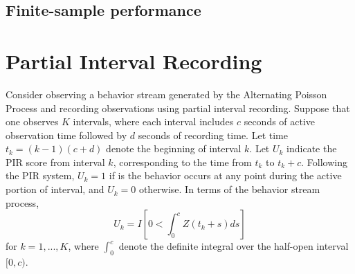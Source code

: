 \documentclass[man, noextraspace, floatsintext]{apa6}\usepackage[]{graphicx}\usepackage[]{color}
\begin{document}
\subsection{Finite-sample performance}

\section{Partial Interval Recording}
\label{sec:PIR}

Consider observing a behavior stream generated by the Alternating Poisson Process and recording observations using partial interval recording. Suppose that one observes $K$ intervals, where each interval includes $c$ seconds of active observation time followed by $d$ seconds of recording time. Let time $t_k = (k-1)(c + d)$ denote the beginning of interval $k$. Let $U_k$ indicate the PIR score from interval $k$, corresponding to the time from $t_k$ to $t_k + c$. Following the PIR system, $U_k = 1$ if is the behavior occurs at any point during the active portion of interval, and $U_k = 0$ otherwise. In terms of the behavior stream process, 
\begin{equation}
U_k = I\left[ 0 < \int_0^c Z\left(t_k + s \right) ds\right]
\end{equation}
for $k = 1,...,K$, where $\int_0^c$ denote the definite integral over the half-open interval $[0,c)$.
\end{document}
